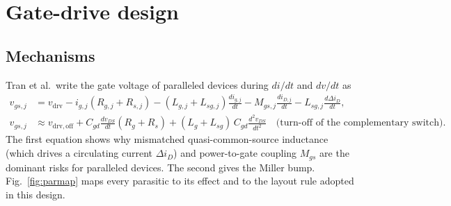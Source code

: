 \documentclass[10pt,a4paper]{article}
\begin{document}
\section{Gate-drive design}\label{sec:gate}
\subsection{Mechanisms}
Tran et al.\ write the gate voltage of paralleled devices during $di/dt$ and $dv/dt$ as~\cite{tran2025}
\begin{align}
v_{gs,j}&=v_\mathrm{drv}-i_{g,j}(R_{g,j}+R_{s,j})-(L_{g,j}+L_{sg,j})\frac{di_{g,j}}{dt}-M_{gs,j}\frac{di_{D,j}}{dt}-L_{sg,j}\frac{d\Delta i_D}{dt}, \\
v_{gs,j}&\approx v_\mathrm{drv,off}+C_{gd}\frac{dv_{DS}}{dt}(R_{g}+R_{s})+(L_{g}+L_{sg})\,C_{gd}\frac{d^2v_{DS}}{dt^2}\quad\text{(turn-off of the complementary switch)}.
\end{align}
The first equation shows why mismatched quasi-common-source inductance (which drives a circulating current $\Delta i_D$) and power-to-gate coupling $M_{gs}$ are the dominant risks for paralleled devices.
The second gives the Miller bump. Fig.~\ref{fig:parmap} maps every parasitic to its effect and to the layout rule adopted in this design.
\end{document}
